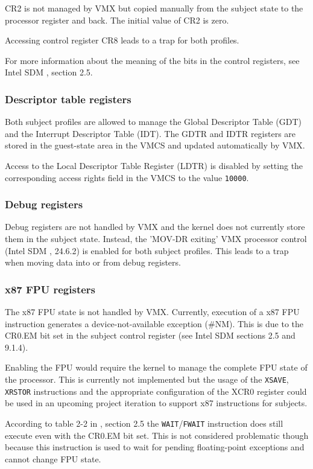 CR2 is not managed by VMX but copied manually from the subject state to the
processor register and back. The initial value of CR2 is zero.

Accessing control register CR8 leads to a trap for both profiles.

For more information about the meaning of the bits in the control registers, see
Intel SDM \cite{IntelSDM}, section 2.5.

\subsubsection{Descriptor table registers}
Both subject profiles are allowed to manage the Global Descriptor Table
(GDT) and the Interrupt Descriptor Table (IDT). The GDTR
and IDTR registers are stored in the guest-state area in the VMCS and updated
automatically by VMX.

Access to the Local Descriptor Table Register (LDTR) is disabled by
setting the corresponding access rights field in the VMCS to the value
\texttt{10000}.

\subsubsection{Debug registers}
Debug registers are not handled by VMX and the kernel does not currently store
them in the subject state. Instead, the 'MOV-DR exiting' VMX processor control
(Intel SDM \cite{IntelSDM}, 24.6.2) is enabled for both subject profiles. This
leads to a trap when moving data into or from debug registers.

\subsubsection{x87 FPU registers}
The x87 FPU state is not handled by VMX. Currently, execution of a x87 FPU
instruction generates a device-not-available exception (\#NM). This is due to
the CR0.EM bit set in the subject control register (see Intel SDM sections 2.5
and 9.1.4).

Enabling the FPU would require the kernel to manage the complete FPU state of
the processor. This is currently not implemented but the usage of the
\texttt{XSAVE}, \texttt{XRSTOR} instructions and the appropriate configuration
of the XCR0 register could be used in an upcoming project iteration to support
x87 instructions for subjects.

According to table 2-2 in \cite{IntelSDM}, section 2.5 the
\texttt{WAIT}/\texttt{FWAIT} instruction does still execute even with the CR0.EM
bit set. This is not considered problematic though because this instruction is
used to wait for pending floating-point exceptions and cannot change FPU state.

